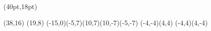 

\PapierGroesse(40pt,18pt)


\begin{psfigur}[clip=nein](38,16)
\psPin(19,8){
	\psPolygon[linienverb=c,farbe=1](-15,0)(-5,7)(10,7)(10,-7)(-5,-7)
	\psLinie[farbe=1](-4,-4)(4,4)
	\psLinie[farbe=1](-4,4)(4,-4)
}
\end{psfigur}
